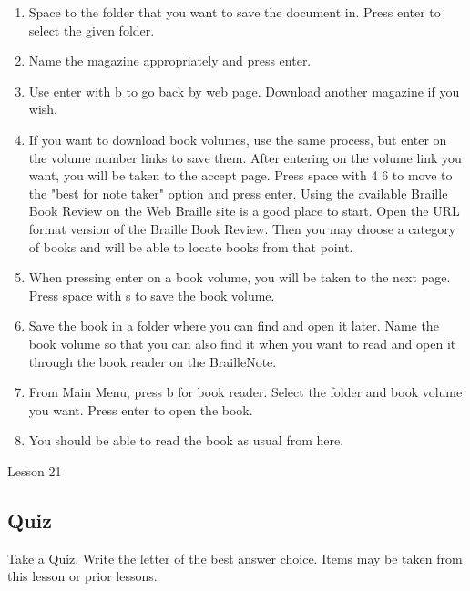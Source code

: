 \documentclass[10pt,letterpaper,twoside]{report}
\begin{document}
{{{{\begin{enumerate}
	\item Space to the folder that you want to save the document in.  Press enter to select the given folder.
	      
	\item Name the magazine appropriately and press enter.
	      
	\item Use enter with b to go back by web page.  Download another magazine if you wish.
	      
	\item If you want to download book volumes, use the same process, but enter on the volume number links to save them.  After entering on the volume link you want, you will be taken to the accept page.  Press space with 4 6 to move to the "best for note taker" option and press enter.  Using the available Braille Book Review on the Web Braille site is a good place to start.  Open the URL format version of the Braille Book Review.  Then you may choose a category of books and will be able to locate books from that point.
	      
	\item When pressing enter on a book volume, you will be taken to the next page.  Press space with s to save the book volume.
	      
	\item Save the book in a folder where you can find and open it later.  Name the book volume so that you can also find it when you want to read and open it through the book reader on the BrailleNote.
	      
	\item From Main Menu, press b for book reader.  Select the folder and book volume you want.  Press enter to open the book.
	      
	\item You should be able to read the book as usual from here.
\end{enumerate}





\clearpage

\newpage
Lesson 21

\subsection{Quiz}



Take a Quiz.  Write the letter of the best answer choice.  Items may be taken from this lesson or prior lessons.



}}}}
\end{document}
